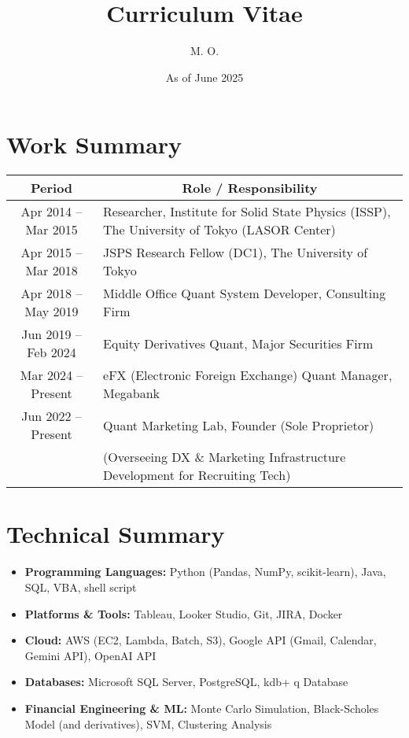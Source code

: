 \documentclass[uplatex,a4j,10.5pt,dvipdfmx]{jsarticle}
\title{\sffamily \bfseries Curriculum Vitae}
\author{M. O.}
\date{As of June 2025}
\begin{document}
\maketitle

\section*{Work Summary}

\begin{longtable}{|c|p{14cm}|}
	\hline
	\multicolumn{1}{|c|}{\textbf{Period}} & \multicolumn{1}{c|}{\textbf{Role / Responsibility}}                                          \\
	\hline
	\endhead

	\hline
	Apr 2014 -- Mar 2015                  & Researcher, Institute for Solid State Physics (ISSP), The University of Tokyo (LASOR Center) \\
	\hline
	Apr 2015 -- Mar 2018                  & JSPS Research Fellow (DC1), The University of Tokyo                                          \\
	\hline
	Apr 2018 -- May 2019                  & Middle Office Quant System Developer, Consulting Firm                                        \\
	\hline
	Jun 2019 -- Feb 2024                  & Equity Derivatives Quant, Major Securities Firm                                              \\
	\hline
	Mar 2024 -- Present                   & eFX (Electronic Foreign Exchange) Quant Manager, Megabank                                    \\
	\hline
	Jun 2022 -- Present                   & Quant Marketing Lab, Founder (Sole Proprietor)                                               \\
	                                      & (Overseeing DX \& Marketing Infrastructure Development for Recruiting Tech)                  \\
	\hline
\end{longtable}

\section*{Technical Summary}
\begin{itemize}[leftmargin=*]
	\item \textbf{Programming Languages:} Python (Pandas, NumPy, scikit-learn), Java, SQL, VBA, shell script
	\item \textbf{Platforms \& Tools:} Tableau, Looker Studio, Git, JIRA, Docker
	\item \textbf{Cloud:} AWS (EC2, Lambda, Batch, S3), Google API (Gmail, Calendar, Gemini API), OpenAI API
	\item \textbf{Databases:} Microsoft SQL Server, PostgreSQL, kdb+ q Database
	\item \textbf{Financial Engineering \& ML:} Monte Carlo Simulation, Black-Scholes Model (and derivatives), SVM, Clustering Analysis
\end{itemize}
\end{document}
